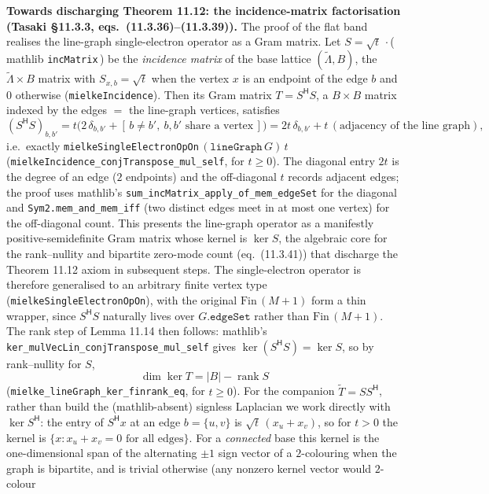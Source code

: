 \documentclass[a4paper,11pt]{article}
\begin{document}
\medskip\noindent\textbf{Towards discharging Theorem 11.12: the incidence-matrix
factorisation (Tasaki §11.3.3, eqs.~(11.3.36)--(11.3.39)).} The proof of the flat
band realises the line-graph single-electron operator as a Gram matrix. Let
$S=\sqrt t\,\cdot$(\,mathlib \texttt{incMatrix}\,) be the \emph{incidence matrix} of
the base lattice $(\tilde\Lambda,B)$, the $\tilde\Lambda\times B$ matrix with
$S_{x,b}=\sqrt t$ when the vertex $x$ is an endpoint of the edge $b$ and $0$
otherwise (\texttt{mielkeIncidence}). Then its Gram matrix $T=S^{\mathsf H}S$, a
$B\times B$ matrix indexed by the edges $=$ the line-graph vertices, satisfies
\[
  (S^{\mathsf H}S)_{b,b'} = t\bigl(2\,\delta_{b,b'} + [\,b\neq b',\ b,b'\text{ share a vertex}\,]\bigr)
  = 2t\,\delta_{b,b'} + t\,(\text{adjacency of the line graph}),
\]
i.e.\ exactly \texttt{mielkeSingleElectronOpOn}$\,(\texttt{lineGraph}\,G)\,t$
(\texttt{mielkeIncidence\_conjTranspose\_mul\_self}, for $t\ge 0$). The diagonal
entry $2t$ is the degree of an edge ($2$ endpoints) and the off-diagonal $t$
records adjacent edges; the proof uses mathlib's
\texttt{sum\_incMatrix\_apply\_of\_mem\_edgeSet} for the diagonal and
\texttt{Sym2.mem\_and\_mem\_iff} (two distinct edges meet in at most one vertex)
for the off-diagonal count. This presents the line-graph operator as a manifestly
positive-semidefinite Gram matrix whose kernel is $\ker S$, the algebraic core for
the rank--nullity and bipartite zero-mode count (eq.~(11.3.41)) that discharge the
Theorem 11.12 axiom in subsequent steps. The single-electron operator is therefore
generalised to an arbitrary finite vertex type (\texttt{mielkeSingleElectronOpOn}),
with the original $\mathrm{Fin}\,(M{+}1)$ form a thin wrapper, since $S^{\mathsf H}S$
naturally lives over $G.\texttt{edgeSet}$ rather than $\mathrm{Fin}\,(M{+}1)$.
The rank step of Lemma 11.14 then follows: mathlib's
\texttt{ker\_mulVecLin\_conjTranspose\_mul\_self} gives $\ker(S^{\mathsf H}S)=\ker S$,
so by rank--nullity for $S$,
\[
  \dim\ker T = |B| - \operatorname{rank} S
\]
(\texttt{mielke\_lineGraph\_ker\_finrank\_eq}, for $t\ge 0$). For the companion
$\tilde T = SS^{\mathsf H}$, rather than build the (mathlib-absent) signless Laplacian we work
directly with $\ker S^{\mathsf H}$: the entry of $S^{\mathsf H}x$ at an edge $b=\{u,v\}$
is $\sqrt t\,(x_u + x_v)$, so for $t>0$ the kernel is
$\{x : x_u + x_v = 0 \text{ for all edges}\}$.  For a \emph{connected} base this kernel is
the one-dimensional span of the alternating $\pm1$ sign vector of a $2$-colouring when the
graph is bipartite, and is trivial otherwise (any nonzero kernel vector would $2$-colour
\end{document}
